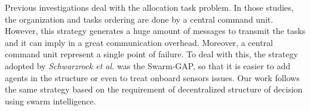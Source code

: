 Previous investigations \cite{ferreira2007swarm,scerri2005allocatingLADCOP, ferreira2010robocup,ikemoto2010adaptive} deal with the allocation task problem. In those studies, the organization and tasks ordering are done by a central command unit. However, this strategy generates a huge amount of messages to transmit the tasks and it can imply in a great communication overhead. Moreover, a central command unit represent a single point of failure. To deal with this, the strategy adopted by \textit{Schwarzrock et al.}\cite{MAS07} was the Swarm-GAP, so that it is easier to add agents in the structure or even to treat onboard sensors issues. Our work follows the same strategy based on the requirement of decentralized structure of decision using swarm intelligence.